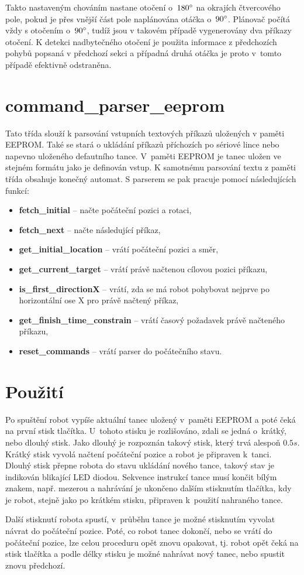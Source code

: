 \documentclass[12pt,a4paper]{report}
\newcommand{\ccc}[1]{\mbox{\fontfamily{lmtt}\selectfont\textbf{#1}}}
\begin{document}
Takto nastaveným chováním nastane otočení o~$180\degree$ na okrajích čtvercového pole, pokud je přes vnější část pole naplánována otáčka o~$90\degree$.
Plánovač počítá vždy s otočením o~$90\degree$, tudíž jsou v takovém případě vygenerovány
dva příkazy otočení. K detekci nadbytečného otočení je použita informace z předchozích
pohybů popsaná v předchozí sekci a případná druhá otáčka je proto v~tomto případě efektivně odstraněna.

\section*{\ccc{command\_parser\_eeprom}}
Tato třída slouží k parsování vstupních textových příkazů uložených v paměti EEPROM.
Také se stará o ukládání příkazů příchozích po sériové lince nebo napevno uloženého
defautního tance. V~paměti EEPROM je tanec uložen ve stejném formátu jako je definován
vstup. K samotnému parsování textu z paměti třída obsahuje konečný automat.
S parserem se pak pracuje pomocí následujících funkcí:
\begin{itemize}
\item \ccc{fetch\_initial} -- načte počáteční pozici a rotaci,
\item \ccc{fetch\_next} -- načte následující příkaz,
\item \ccc{get\_initial\_location} -- vrátí počáteční pozici a směr, 
\item \ccc{get\_current\_target} -- vrátí právě načtenou cílovou pozici příkazu,
\item \ccc{is\_first\_directionX} -- vrátí, zda se má robot pohybovat nejprve po horizontální ose X pro právě načtený příkaz,
\item \ccc{get\_finish\_time\_constrain} -- vrátí časový požadavek právě načteného příkazu,
\item \ccc{reset\_commands} -- vrátí parser do počátečního stavu. 
\end{itemize}


\section*{Použití}
Po spuštění robot vypíše aktuální tanec uložený v~paměti EEPROM a poté čeká na první stisk tlačítka. U~tohoto stisku je rozlišováno, zdali se jedná o~krátký, nebo dlouhý stisk. Jako dlouhý je rozpoznán takový stisk, který trvá alespoň $0.5s$. Krátký stisk vyvolá načtení počáteční pozice a robot je připraven k~tanci. Dlouhý stisk přepne robota do stavu ukládání nového tance, takový stav je indikován blikající LED diodou. Sekvence instrukcí tance musí končit bílým znakem, např. mezerou a nahrávání je ukončeno dalším stisknutím tlačítka, kdy je robot, stejně jako po krátkém stisku, připraven k~použití nahraného tance.

Další stisknutí robota spustí, v~průběhu tance je možné stisknutím vyvolat návrat do počáteční pozice. Poté, co robot tanec dokončí, nebo se vrátí do počáteční pozice, lze celou proceduru opět znovu opakovat, tj. robot opět čeká na stisk tlačítka a podle délky stisku je možné nahrávat nový tanec, nebo spustit znovu předchozí.
\end{document}
